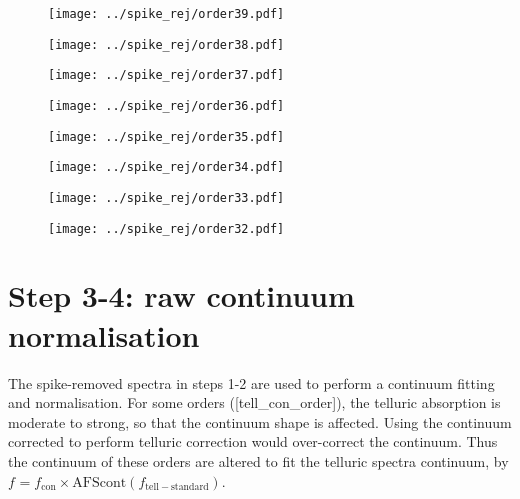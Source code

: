 \documentclass{article}
\begin{document}
\begin{figure}[H]
    \centering
    \texttt{[image: ../spike\_rej/order39.pdf]}
\end{figure}
\begin{figure}[H]
    \centering
    \texttt{[image: ../spike\_rej/order38.pdf]}
\end{figure}
\begin{figure}[H]
    \centering
    \texttt{[image: ../spike\_rej/order37.pdf]}
\end{figure}
\begin{figure}[H]
    \centering
    \texttt{[image: ../spike\_rej/order36.pdf]}
\end{figure}
\begin{figure}[H]
    \centering
    \texttt{[image: ../spike\_rej/order35.pdf]}
\end{figure}
\begin{figure}[H]
    \centering
    \texttt{[image: ../spike\_rej/order34.pdf]}
\end{figure}
\begin{figure}[H]
    \centering
    \texttt{[image: ../spike\_rej/order33.pdf]}
\end{figure}
\begin{figure}[H]
    \centering
    \texttt{[image: ../spike\_rej/order32.pdf]}
\end{figure}


\newpage

\section{Step 3-4: raw continuum normalisation}

The spike-removed spectra in steps 1-2 are used to perform a continuum fitting and normalisation.
For some orders ([tell_con_order]), the telluric absorption is moderate to strong, so that the continuum shape is affected.
Using the continuum corrected to perform telluric correction would over-correct the continuum. 
Thus the continuum of these orders are altered to fit the telluric spectra continuum, by $f_\mathrm{} = f_\mathrm{con} \times \mathrm{AFScont}(f_\mathrm{tell-standard})$.
\end{document}
